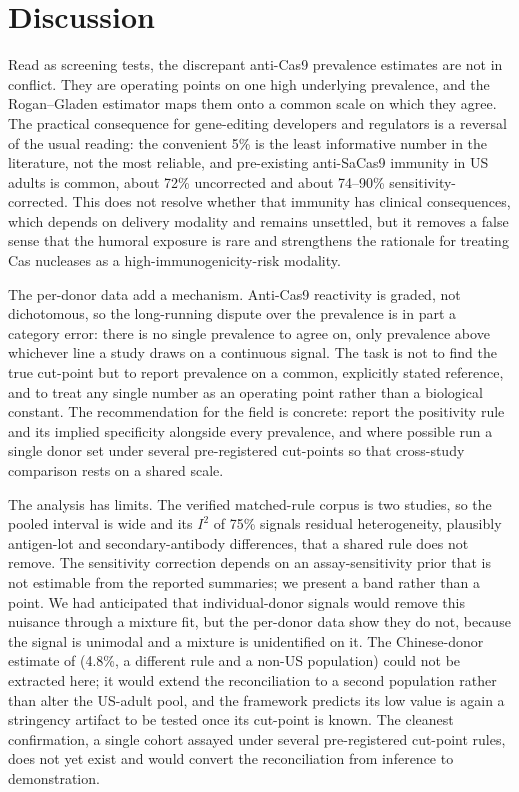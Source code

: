 \documentclass[11pt]{article}
\begin{document}
\section{Discussion}
Read as screening tests, the discrepant anti-Cas9 prevalence estimates are not in conflict. They are operating points on one high underlying prevalence, and the Rogan--Gladen estimator maps them onto a common scale on which they agree. The practical consequence for gene-editing developers and regulators is a reversal of the usual reading: the convenient 5\% is the least informative number in the literature, not the most reliable, and pre-existing anti-SaCas9 immunity in US adults is common, about 72\% uncorrected and about 74--90\% sensitivity-corrected. This does not resolve whether that immunity has clinical consequences, which depends on delivery modality and remains unsettled, but it removes a false sense that the humoral exposure is rare and strengthens the rationale for treating Cas nucleases as a high-immunogenicity-risk modality.

The per-donor data add a mechanism. Anti-Cas9 reactivity is graded, not dichotomous, so the long-running dispute over the prevalence is in part a category error: there is no single prevalence to agree on, only prevalence above whichever line a study draws on a continuous signal. The task is not to find the true cut-point but to report prevalence on a common, explicitly stated reference, and to treat any single number as an operating point rather than a biological constant. The recommendation for the field is concrete: report the positivity rule and its implied specificity alongside every prevalence, and where possible run a single donor set under several pre-registered cut-points so that cross-study comparison rests on a shared scale.

The analysis has limits. The verified matched-rule corpus is two studies, so the pooled interval is wide and its $I^2$ of 75\% signals residual heterogeneity, plausibly antigen-lot and secondary-antibody differences, that a shared rule does not remove. The sensitivity correction depends on an assay-sensitivity prior that is not estimable from the reported summaries; we present a band rather than a point. We had anticipated that individual-donor signals would remove this nuisance through a mixture fit, but the per-donor data show they do not, because the signal is unimodal and a mixture is unidentified on it. The Chinese-donor estimate of \citet{shen2022} (4.8\%, a different rule and a non-US population) could not be extracted here; it would extend the reconciliation to a second population rather than alter the US-adult pool, and the framework predicts its low value is again a stringency artifact to be tested once its cut-point is known. The cleanest confirmation, a single cohort assayed under several pre-registered cut-point rules, does not yet exist and would convert the reconciliation from inference to demonstration.
\end{document}
